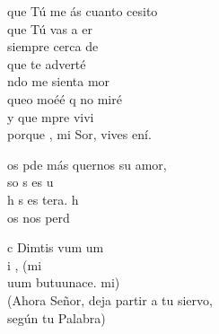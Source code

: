 \documentclass[12pt]{article}
\begin{document}
\begin{multicols*}{2}
\begin{cancion}%
	 que Tú me ás cuanto cesito \\
	 que Tú vas a er  \\
	siempre cerca de  \\
	 que te adverté \\
	ndo me sienta mor\\
	 queo moéé q no miré\\
	y que mpre vivi \\
	porque , mi Sor, vives ení.  \\
\end{cancion}%

\begin{cancion}%
	os pde más quernos su amor,\\
	so s es u \\
	h s es tera. h \\
	os nos perd\\
\end{cancion}%

\begin{cancion}%
	c Dimtis vum um \\
	i , (mi\\
	uum butuunace. mi)\\
(Ahora Señor, deja partir a tu siervo,\\
 según tu Palabra)\\
\end{cancion}%


\end{multicols*}
\end{document}
